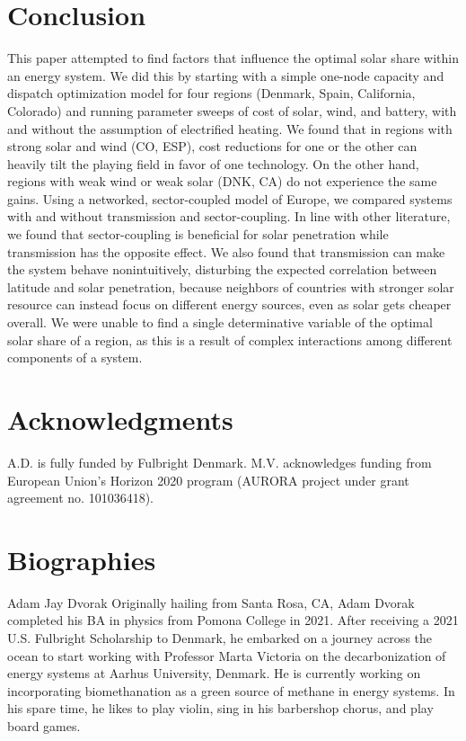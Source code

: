 \documentclass[lettersize,journal]{IEEEtran}
\begin{document}
\section{Conclusion}
This paper attempted to find factors that influence the optimal solar share within an energy system. We did this by starting with a simple one-node capacity and dispatch optimization model for four regions (Denmark, Spain, California, Colorado) and running parameter sweeps of cost of solar, wind, and battery, with and without the assumption of electrified heating. We found that in regions with strong solar and wind (CO, ESP), cost reductions for one or the other can heavily tilt the playing field in favor of one technology. On the other hand, regions with weak wind or weak solar (DNK, CA) do not experience the same gains. Using a networked, sector-coupled model of Europe, we compared systems with and without transmission and sector-coupling. In line with other literature, we found that sector-coupling is beneficial for solar penetration while transmission has the opposite effect. We also found that transmission can make the system behave nonintuitively, disturbing the expected correlation between latitude and solar penetration, because neighbors of countries with stronger solar resource can instead focus on different energy sources, even as solar gets cheaper overall. We were unable to find a single determinative variable of the optimal solar share of a region, as this is a result of complex interactions among different components of a system.


\section*{Acknowledgments}
A.D. is fully funded by Fulbright Denmark. M.V. acknowledges funding from European Union’s Horizon 2020 program (AURORA project under grant agreement no. 101036418).








\newpage

\section{Biographies}

 



\begin{IEEEbiographynophoto}{Adam Jay Dvorak}
Originally hailing from Santa Rosa, CA, Adam Dvorak completed his BA in physics from Pomona College in 2021. After receiving a 2021 U.S. Fulbright Scholarship to Denmark, he embarked on a journey across the ocean to start working with Professor Marta Victoria on the decarbonization of energy systems at Aarhus University, Denmark. He is currently working on incorporating biomethanation as a green source of methane in energy systems. In his spare time, he likes to play violin, sing in his barbershop chorus, and play board games.
\end{IEEEbiographynophoto}
\end{document}
